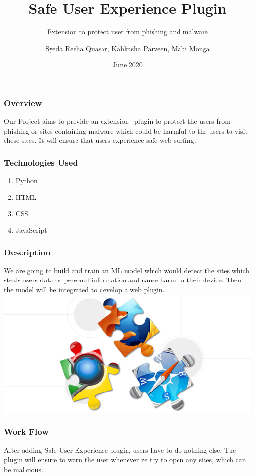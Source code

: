 \documentclass[14pt]{beamer}
\title[SUE]{Safe User Experience Plugin}
\subtitle{Extension to protect user from phishing and malware}
\author[Team 36]{Syeda Reeha Quasar, Kahkasha Parveen, Mahi Monga}
\date{June 2020}
\begin{document}
\begin{frame}
    \titlepage
\end{frame}

\begin{frame}
    \frametitle{Overview}
    Our Project aims to provide an extension \ plugin to protect the users from phishing or sites containing malware which could be harmful to the users to visit these sites. It will ensure that users experience safe web surfing.
\end{frame}

\begin{frame}
    \frametitle{Technologies Used}
    \begin{enumerate}
        \item{Python}
        \item{HTML}
        \item{CSS}
        \item{JavaScript}
    \end{enumerate}
\end{frame}

\begin{frame}
    \frametitle{Description}
    We are going to build and train an ML model which would detect the sites which steals users data or personal information and cause harm to their device.
    Then the model will be integrated to develop a web plugin.
    \includegraphics{imag}
    \href{https://developer.chrome.com/extensions/getstarted}{}
\end{frame}

\begin{frame}
    \frametitle{Work Flow}
    After adding Safe User Experience plugin, users have to do nothing else. The plugin will ensure to warn the user whenever ze try to open any sites, which can be malicious.
\end{frame}
\end{document}

